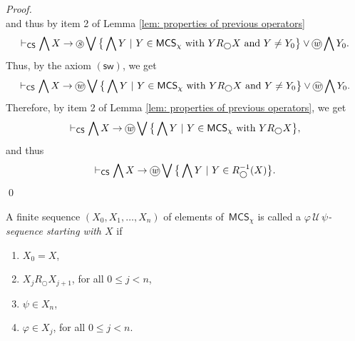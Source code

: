 \documentclass[envcountsect,envcountsame,oribibl,orivec]{llncs}
\newcommand*\circled[1]{\tikz[baseline=(char.base)]{
		\node[shape=circle,draw,inner sep=0.4pt] (char) {#1};}}
\newcommand{\lnext}{\bigcirc}
\newcommand{\luntil}{{\,\mathcal{U}\,}}
\newcommand{\wprevious}{\circled{\textit{w}}}
\newcommand{\sprevious}{\circled{\textit{s}}}
\newcommand{\swprevax}{\ensuremath{(\textsf{sw})}}
\newcommand{\CS}{\textsf{CS}}
\renewcommand{\phi}{\varphi}
\newcommand{\MCS}{\mathsf{MCS}}
\begin{document}
\begin{proof}
\[	\]
	and thus by item 2 of Lemma \ref{lem: properties of previous operators}
	\[
	\vdash_\CS \bigwedge X \to \sprevious \bigvee \big\{\bigwedge Y \ |\ Y \in  \MCS_\chi  \text{ with } Y  R_\lnext X   \text{ and } Y \neq Y_0 \big\} \vee \wprevious \bigwedge Y_0.
	\]
	Thus, by the axiom $\swprevax$, we get
	\[
	\vdash_\CS \bigwedge X \to \wprevious \bigvee \big\{\bigwedge Y \ |\ Y \in  \MCS_\chi  \text{ with } Y  R_\lnext X   \text{ and } Y \neq Y_0 \big\} \vee \wprevious \bigwedge Y_0.
	\]
	Therefore, by item 2 of Lemma \ref{lem: properties of previous operators}, we get
	\[
	\vdash_\CS \bigwedge X \to \wprevious \bigvee \big\{\bigwedge Y \ |\ Y \in  \MCS_\chi  \text{ with }  Y R_\lnext X \big\},
	\]
	and thus
	\[
	\vdash_\CS \bigwedge X \to \wprevious \bigvee \big\{ \bigwedge Y \ |\ Y \in R_\lnext^{-1}(X) \big\}.  
	\]
	\qed
\end{proof}

\begin{definition}
	A finite sequence $(X_0, X_1, \ldots, X_n)$ of elements of~$\MCS_\chi$ is called a \emph{$\phi \luntil \psi$-sequence starting with $X$} if
	\begin{enumerate}
		\item $X_0 = X$,
		
		\item $X_j R_\lnext X_{j+1}$, for all $0 \leq j < n$, 
		
		\item $\psi \in X_n$,
		
		\item $\phi \in X_j$, for all $0 \leq j < n$.
	\end{enumerate}
\end{definition}
\end{document}
